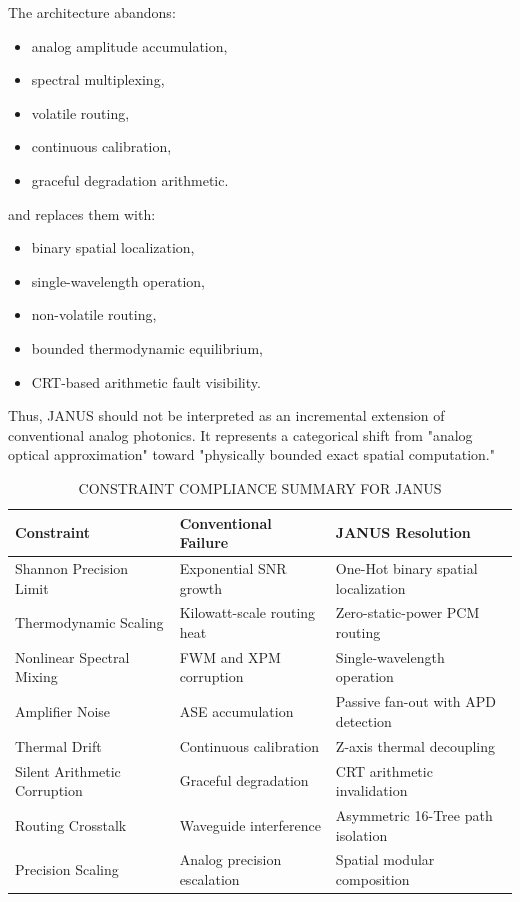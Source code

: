 \documentclass[journal]{IEEEtran}
\begin{document}
The architecture abandons:
\begin{itemize}
\item  analog amplitude accumulation,
\item  spectral multiplexing,
\item  volatile routing,
\item  continuous calibration,
\item  graceful degradation arithmetic.
\end{itemize}

and replaces them with:
\begin{itemize}
\item  binary spatial localization,
\item  single-wavelength operation,
\item  non-volatile routing,
\item  bounded thermodynamic equilibrium,
\item  CRT-based arithmetic fault visibility.
\end{itemize}

Thus, JANUS should not be interpreted as an incremental extension of conventional analog photonics. It represents a categorical shift from "analog optical approximation" toward "physically bounded exact spatial computation."

\begin{table}[htbp]
\centering
\small
\setlength{\tabcolsep}{2pt}
\caption{CONSTRAINT COMPLIANCE SUMMARY FOR JANUS}
\label{tab:table20}
\begin{tabular}{lll}
\toprule
Constraint & Conventional Failure & JANUS Resolution \\
\midrule
Shannon Precision Limit & Exponential SNR growth & One-Hot binary spatial localization \\
Thermodynamic Scaling & Kilowatt-scale routing heat & Zero-static-power PCM routing \\
Nonlinear Spectral Mixing & FWM and XPM corruption & Single-wavelength operation \\
Amplifier Noise & ASE accumulation & Passive fan-out with APD detection \\
Thermal Drift & Continuous calibration & Z-axis thermal decoupling \\
Silent Arithmetic Corruption & Graceful degradation & CRT arithmetic invalidation \\
Routing Crosstalk & Waveguide interference & Asymmetric 16-Tree path isolation \\
Precision Scaling & Analog precision escalation & Spatial modular composition \\
\bottomrule
\end{tabular}
\end{table}
\end{document}
